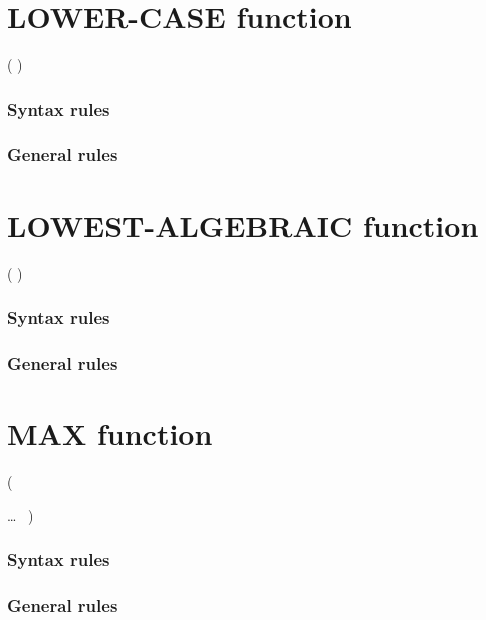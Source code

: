 \section{LOWER-CASE function}

\begin{syntax}
    ( \argument )
\end{syntax}

\subsubsection{Syntax rules}

\subsubsection{General rules}

\section{LOWEST-ALGEBRAIC function}

\begin{syntax}
    ( \argument )
\end{syntax}

\subsubsection{Syntax rules}

\subsubsection{General rules}

\section{MAX function}

\begin{syntax}
    (
  \begin{1=}
    \argument
  \end{1=}\ldots
  \ {})
\end{syntax}

\subsubsection{Syntax rules}

\subsubsection{General rules}


